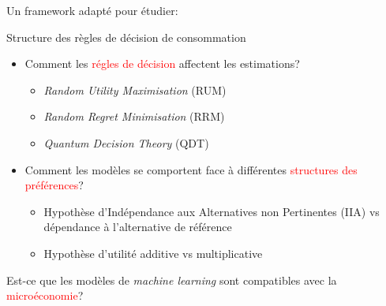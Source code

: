 \documentclass[11pt,ignorenonframetext,]{beamer}
\providecommand{\tightlist}{%
  \setlength{\itemsep}{0pt}\setlength{\parskip}{0pt}}
\begin{document}
\begin{frame}{Un framework adapté pour étudier:}
\protect\hypertarget{un-framework-adapte-pour-etudier}{}

\begin{block}{Structure des règles de décision de consommation}

\begin{itemize}
\tightlist
\item
  Comment les \textcolor{red}{régles de décision} affectent les
  estimations?

  \begin{itemize}
  \tightlist
  \item
    \emph{Random Utility Maximisation} (RUM)
  \item
    \emph{Random Regret Minimisation} (RRM)
  \item
    \emph{Quantum Decision Theory} (QDT)
  \end{itemize}
\item
  Comment les modèles se comportent face à différentes
  \textcolor{red}{structures des préférences}?

  \begin{itemize}
  \tightlist
  \item
    Hypothèse d'Indépendance aux Alternatives non Pertinentes (IIA) vs
    dépendance à l'alternative de référence
  \item
    Hypothèse d'utilité additive vs multiplicative
  \end{itemize}
\end{itemize}

Est-ce que les modèles de \emph{machine learning} sont compatibles avec
la \textcolor{red}{microéconomie}?

\end{block}

\end{frame}
\end{document}
